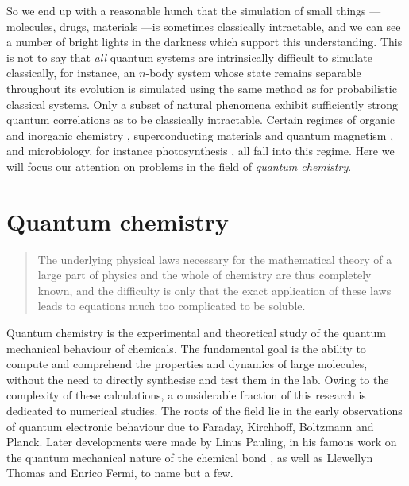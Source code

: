 So we end up with a reasonable hunch that the simulation of small things --- molecules, drugs, materials ---is sometimes classically intractable, and we can see a number of bright lights in the darkness which support this understanding.  This is not to say that \emph{all} quantum systems are intrinsically difficult to simulate classically,  for instance, an $n$-body system whose state remains separable throughout its evolution is simulated using the same method as for probabilistic classical systems. Only a subset of natural phenomena exhibit sufficiently strong quantum correlations as to be classically intractable. Certain regimes of organic \cite{Babbush2012} and inorganic chemistry \cite{Halasz2012}, superconducting materials \cite{Anderson1987, Moessner2000} and quantum magnetism \cite{Britton2012}, and microbiology, for instance photosynthesis \cite{Sarovar2010}, all fall into this regime. Here we will focus our attention on problems in the field of \emph{quantum chemistry}.

\section{Quantum chemistry} 
\begin{quote}
    The underlying physical laws necessary for the mathematical theory of a large part of physics and the whole of chemistry are thus completely known, and the difficulty is only that the exact application of these laws leads to equations much too complicated to be soluble. 
   \cite{Dirac1929}
\end{quote}
Quantum chemistry is the experimental and theoretical study of the quantum mechanical behaviour of chemicals.  The fundamental goal is the ability to compute and comprehend the properties and dynamics of large molecules, without the need to directly synthesise and test them in the lab.  
Owing to the complexity of these calculations, a considerable fraction of this research is dedicated to numerical studies.  The roots of the field lie in the early observations of quantum electronic behaviour due to Faraday, Kirchhoff, Boltzmann and Planck. Later developments were made by Linus Pauling, in his famous work on the quantum mechanical nature of the chemical bond \cite{Pauling1939}, as well as Llewellyn Thomas and Enrico Fermi, to name but a few. 

